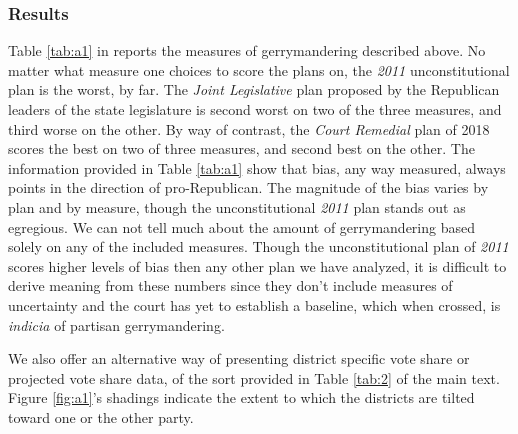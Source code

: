 \subsubsection*{Results}
Table \ref{tab:a1} in reports the measures of gerrymandering described above. No matter what measure one choices to score the plans on, the \textit{2011} unconstitutional plan is the worst, by far. The \textit{Joint Legislative} plan proposed by the Republican leaders of the state legislature is second worst on two of the three measures, and third worse on the other. By way of contrast, the \textit{Court Remedial} plan of 2018 scores the best on two of three measures, and second best on the other. The information provided in Table \ref{tab:a1} show that bias, any way measured, always points in the direction of pro-Republican.  The magnitude of the bias varies by plan and by measure, though the unconstitutional \textit{2011} plan stands out as egregious. We can not tell much about the amount of gerrymandering based solely on any of the included measures. Though the unconstitutional plan of \textit{2011} scores higher levels of bias then any other plan we have analyzed, it is difficult to derive meaning from these numbers since they don't include measures of uncertainty and the court has yet to establish a baseline, which when crossed, is \textit{indicia} of partisan gerrymandering.  

We also offer an alternative way of presenting district specific vote share or projected vote share data, of the sort provided in Table \ref{tab:2} of the main text. Figure \ref{fig:a1}’s shadings indicate the extent to which the districts are tilted toward one or the other party.    
